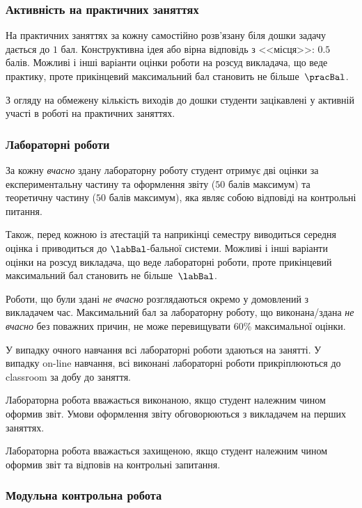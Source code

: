\documentclass{Syllabus}
\begin{document}
\subsubsection*{Активність на практичних заняттях}

На практичних заняттях за кожну самостійно розв’язану біля дошки задачу дається до $1$ бал. Конструктивна ідея або вірна відповідь з <<місця>>: $0.5$ балів. Можливі і інші варіанти оцінки роботи на розсуд викладача, що веде практику, проте прикінцевий максимальний бал становить не більше~$\pracBal$.

З огляду на обмежену кількість виходів до дошки студенти зацікавлені у активній участі в роботі на практичних заняттях.

\subsubsection*{Лабораторні роботи}

За кожну \emph{вчасно} здану лабораторну роботу студент отримує дві оцінки за експериментальну частину та оформлення звіту ($ 50 $ балів максимум) та теоретичну частину ($ 50 $ балів максимум), яка являє собою відповіді на контрольні питання.

Також, перед кожною із атестацій та наприкінці семестру виводиться середня оцінка  і приводиться до $ \labBal $-бальної системи. Можливі і інші варіанти оцінки на розсуд викладача, що веде лабораторні роботи, проте прикінцевий максимальний бал становить не більше~$\labBal$.

Роботи, що були здані \emph{не вчасно} розглядаються окремо у домовлений з викладачем час. Максимальний бал за лабораторну роботу, що виконана/здана \emph{не вчасно} без поважних причин, не може перевищувати 60\% максимальної оцінки.

У випадку очного навчання всі лабораторні роботи здаються на занятті. У випадку on-line навчання, всі виконані лабораторні роботи прикріплюються до classroom за добу до заняття.

Лабораторна робота вважається виконаною, якщо студент належним чином оформив звіт. Умови оформлення звіту обговорюються з викладачем на перших заняттях.

Лабораторна робота вважається захищеною, якщо студент належним чином оформив звіт та відповів на контрольні запитання.


\subsubsection*{Модульна контрольна робота}
\end{document}
